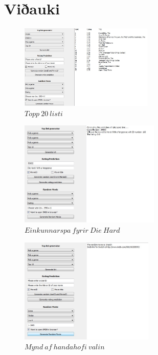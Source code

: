 \documentclass[11pt,a4paper]{amsart}
\theoremstyle{plain}
\theoremstyle{definition}
\theoremstyle{remark}
\begin{document}
\section{Viðauki}

\begin{figure}[H]
\centering
\includegraphics[height=40mm]{ui_top20.jpg}
\caption{$ Topp\ 20\ listi $\label{fig:top20}}
\end{figure}

\begin{figure}[H]
\centering
\includegraphics[height=50mm]{predict.jpg}
\caption{$ Einkunnarspa\ fyrir\ Die\ Hard $\label{fig:predict}}
\end{figure}

\begin{figure}[H]
\centering
\includegraphics[height=50mm]{rand.jpg}
\caption{$ Mynd\ af\ handahofi\ valin $\label{fig:rad}}
\end{figure}

%
\end{document}
